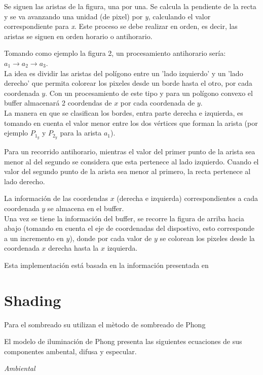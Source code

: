 \documentclass[12pt]{article}
\begin{document}
Se siguen las aristas de la figura, una por una. Se calcula la pendiente de la recta y se va avanzando una unidad (de pixel) por \textit{y}, calculando el valor correspondiente para \textit{x}. Este proceso se debe realizar en orden, es decir, las aristas se siguen en orden horario o antihorario. 

Tomando como ejemplo la figura 2, un procesamiento antihorario sería: $a_{1} \rightarrow a_{2} \rightarrow a_{3}$.\\

La idea es dividir las aristas del polígono entre un 'lado izquierdo' y un 'lado derecho' que permita colorear los pixeles desde un borde hasta el otro, por cada coordenada $y$. 
Con un procesamiento de este tipo y para un polígono convexo el buffer almacenará 2 coordendas de $x$ por cada coordenada de $y$.\\

La manera en que se clasifican los bordes, entra parte derecha e izquierda, es tomando en cuenta el valor menor entre los dos vértices que forman la arista (por ejemplo $P_{1_{y}}$ y $P_{2_{y}}$ para la arista $a_{1}$).

Para un recorrido antihorario, mientras el valor del primer punto de la arista sea menor al del segundo se considera que esta pertenece al lado izquierdo. Cuando el valor del segundo punto de la arista sea menor al primero, la recta pertenece al lado derecho. 

La información de las coordendas $x$ (derecha e izquierda) correspondientes a cada coordenada $y$ se almacena en el buffer.\\

Una vez se tiene la información del buffer, se recorre la figura de arriba hacia abajo (tomando en cuenta el eje de coordenadas del dispostivo, esto corresponde a un incremento en  $y$), donde por cada valor de $y$ se colorean los pixeles desde la coordenada $x$ derecha hasta la $x$ izquierda.

Esta implementación está basada en la información presentada en \cite{bb}


\section{Shading}
Para el sombreado su utilizan el mètodo de sombreado de Phong 

El modelo de iluminación de Phong presenta las siguientes ecuaciones de sus componentes ambental, difusa y especular.

\textit{Ambiental}
\end{document}
